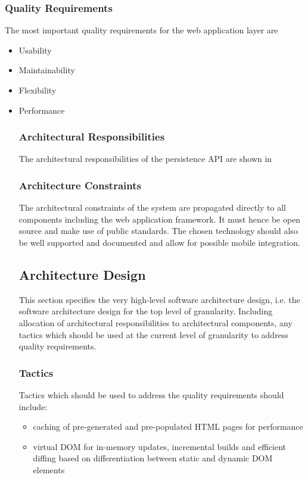 \subsubsection{Quality Requirements}
The most important quality requirements for the web application layer are
\begin{itemize}
	\item Usability
	\item Maintainability
	\item Flexibility
	\item Performance
	
\subsubsection{Architectural Responsibilities}
The architectural responsibilities of the persistence API are shown in
 
\subsubsection{Architecture Constraints}
The architectural constraints of the system are propagated directly to all 
components including the web application framework. It must hence be open source
and make use of public standards. The chosen technology should also be well 
supported and documented and allow for possible mobile integration.

\subsection{Architecture Design}
This section specifies the very high-level software architecture design, i.e.
the software architecture design for the top level of granularity. Including 
allocation of architectural responsibilities to architectural components, any
tactics which should be used at the current level of granularity to address
quality requirements.

\subsubsection{Tactics}
Tactics which should be used to address the quality requirements should include:
\begin{itemize}
	\item caching of pre-generated and pre-populated HTML pages for performance
	\item virtual DOM for in-memory updates, incremental builds and efficient 
	diffing based on differentiation between static and dynamic DOM elements
\end{itemize}

\end{itemize}
